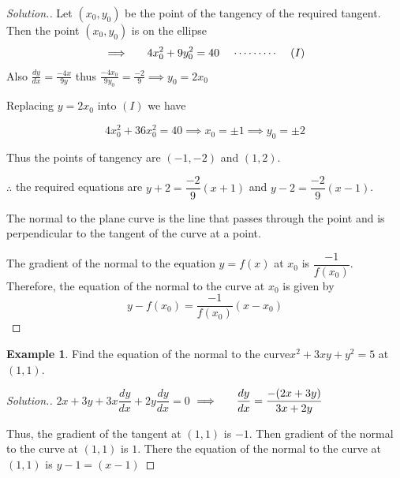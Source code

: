 \documentclass[11pt,a4paper]{article}
\theoremstyle{definition}
\newtheorem{exa}[thm]{Example}
\newenvironment{solution}
  {\renewcommand{\qedsymbol}{}\begin{proof}[\textit{Solution}.]}
  {\end{proof}}
\begin{document}
\begin{solution}


Let $(x_0,y_0)$ be the point of the tangency  of the required tangent. Then the point $(x_0,y_0)$ is on the ellipse $$\implies\hspace{0.5cm} 4x_0^2 + 9y_0^2 = 40\hspace{0.4cm} \cdots\cdots\cdots\hspace{0.4cm} (I)$$
Also $\displaystyle{\frac{dy}{dx} = \frac{-4x}{9y}}$ thus $\displaystyle{\frac{-4x_0}{9y_0} = \frac{-2}{9}\implies y_0 = 2x_0}$


Replacing $y = 2x_0$ into $(I)$ we have 

$$4x^2_0 + 36x^2_0 = 40 \implies x_0 = \pm 1 \implies y_0 = \pm 2$$

Thus the points of tangency are $(-1, -2)$ and $(1,2)$.


$\therefore$ the required equations are $y + 2 = \dfrac{-2}{9}(x + 1)$ and $y - 2 = \dfrac{-2}{9}(x - 1)$.


The normal to the plane curve is the line that passes through the point and is perpendicular to the tangent of the curve at a point.


\begin{figure}[H]
\centering
{}
\end{figure}

The gradient of the normal to the equation $y = f(x)$ at $x_0$ is $\dfrac{-1}{f(x_0)}$. Therefore, the equation of the normal to the curve at $x_0$ is given by $$\boxed{y - f(x_0) = \frac{-1}{f(x_0)} (x - x_0)}$$
\end{solution}


\begin{exa}


Find the equation of the normal to the curve\hspace{0.2cm}$x^2 +3xy + y^2 = 5$\hspace{0.2cm} at $(1,1)$.
\end{exa}


\begin{solution}


$2x + 3y + 3x\dfrac{dy}{dx} + 2y\dfrac{dy}{dx} = 0$
$\implies\hspace{0.5cm} \dfrac{dy}{dx} = \dfrac{-(2x + 3y)}{3x + 2y}$


Thus, the gradient of the tangent at $(1,1)$ is $-1$. Then gradient of the normal to the curve at $(1,1)$ is $1$. There the equation of the normal to the curve at $(1,1)$ is $y - 1 = (x - 1)$
\end{solution}
\end{document}
